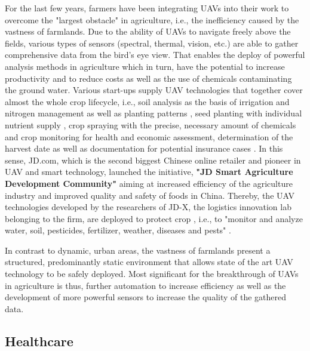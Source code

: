 For the last few years,
farmers have been integrating UAVs into their work
to overcome the "largest obstacle" \cite{Ahirwar2019} in agriculture,
i.e., the inefficiency caused by the vastness of farmlands.
Due to the ability of UAVs to
navigate freely above the fields, 
various types of sensors (spectral, thermal, vision, etc.) 
are able to gather 
comprehensive data from the bird's eye view.
That enables the deploy of
powerful analysis methods in agriculture
which in turn, have the potential to
increase productivity
and to reduce costs as well as the use of chemicals
contaminating the ground water.
Various start-ups supply
UAV technologies
that together cover almost the whole crop lifecycle,
i.e., soil analysis as the basis of irrigation and nitrogen management as well as planting patterns \cite{DeveronUAS},
seed planting with individual nutrient supply \cite{DroneSeed}, 
crop spraying with the precise, necessary amount of chemicals \cite{HSE} and
crop monitoring for health and economic assessment,
determination of the harvest date as well as 
documentation for potential insurance cases \cite{PrecisionHawk}.
In this sense, JD.com,
which is the second biggest Chinese online retailer
and pioneer in UAV and smart technology,
launched the initiative,
\textbf{"JD Smart Agriculture Development Community"}
aiming at increased efficiency of the agriculture industry
and improved quality and safety of foods in China.
Thereby, the UAV technologies developed
by the researchers of JD-X, 
the logistics innovation lab belonging to the firm,
are deployed to protect crop
, i.e., to 
"monitor and analyze water, soil, pesticides, fertilizer, weather, diseases and pests"
\cite{JD.com2018}.

In contrast to dynamic, urban areas, the vastness of farmlands
present a structured, predominantly static environment
that allows state of the art UAV technology to be safely deployed.
Most significant for the breakthrough of UAVs in agriculture is thus,
further automation to increase efficiency
as well as 
the development of more powerful sensors to increase the 
quality of the gathered data.

\cite{Mazur2016}\cite{Ahirwar2019}


\subsection{Healthcare}



